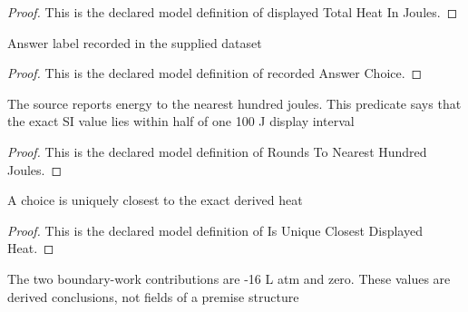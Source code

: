\begin{proof}
  This is the declared model definition of displayed Total Heat In Joules.
\end{proof}
\begin{definition}
  \label{def:physics:phyx-mini-0491:phyxminiproblems-problemphyxmini0491-recordedanswerchoice}
  Answer label recorded in the supplied dataset
\end{definition}
\begin{proof}
  This is the declared model definition of recorded Answer Choice.
\end{proof}
\begin{definition}
  \label{def:physics:phyx-mini-0491:phyxminiproblems-problemphyxmini0491-roundstonearesthundredjoules}
  The source reports energy to the nearest hundred joules. This predicate says that the exact SI value lies within half of one 100 J display interval
\end{definition}
\begin{proof}
  This is the declared model definition of Rounds To Nearest Hundred Joules.
\end{proof}
\begin{definition}
  \label{def:physics:phyx-mini-0491:phyxminiproblems-problemphyxmini0491-isuniqueclosestdisplayedheat}
  A choice is uniquely closest to the exact derived heat
\end{definition}
\begin{proof}
  This is the declared model definition of Is Unique Closest Displayed Heat.
\end{proof}
\begin{lemma}
  \label{lem:physics:phyx-mini-0491:phyxminiproblems-problemphyxmini0491-boundaryworkalongbda}
  The two boundary-work contributions are -16 L atm and zero. These values are derived conclusions, not fields of a premise structure
\end{lemma}
